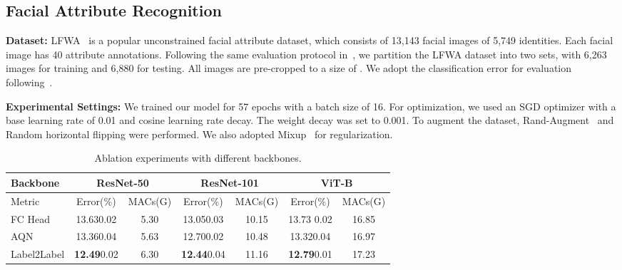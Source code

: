 \documentclass[runningheads]{llncs}
\begin{document}
\subsection{Facial Attribute Recognition}
\textbf{Dataset:} LFWA~\cite{liu2015deep}
is a popular unconstrained facial attribute dataset, which
consists of 13,143 facial images of 5,749 identities. Each facial image has 40 attribute annotations. Following the same evaluation protocol in~\cite{liu2015deep,cao2018partially,hand2017attributes}, we partition the LFWA dataset into two sets, with 6,263 images for training and 6,880 for testing. All images are pre-cropped to a size of . We adopt the classification error for evaluation following~\cite{cao2018partially,shu2021learning}. 

\textbf{Experimental Settings:} We trained our model for 57 epochs with a batch size of 16. For optimization, we used an SGD optimizer with a base learning rate of 0.01 and cosine learning rate decay. The weight decay was set to 0.001. To augment the dataset, Rand-Augment~\cite{Cubuk2020RandAugment} and Random horizontal flipping were performed. We also adopted Mixup~\cite{zhang2017mixup} for regularization.




\begin{table}[t]
  \caption{Ablation experiments with different backbones.}
  \label{table:ablation:back}
  \centering
  \begin{tabular}{lcccccc}
  \toprule
  Backbone & \multicolumn{2}{c}{ResNet-50}& \multicolumn{2}{c}{ResNet-101}  & \multicolumn{2}{c}{ViT-B} \\
  \midrule
  Metric & Error(\%) & MACs(G) & Error(\%) & MACs(G) & Error(\%) & MACs(G) \\ 
  \midrule
  FC Head & 13.630.02 & 5.30 & 13.050.03 & 10.15 & 13.73 0.02& 16.85  \\
  AQN & 13.360.04 & 5.63 & 12.700.02 & 10.48 & 13.320.04 & 16.97 \\
  Label2Label & \textbf{12.49}0.02& 6.30 & \textbf{12.44}0.04 & 11.16& \textbf{12.79}0.01 & 17.23\\
  \bottomrule
  \end{tabular}
\end{table}
\end{document}
